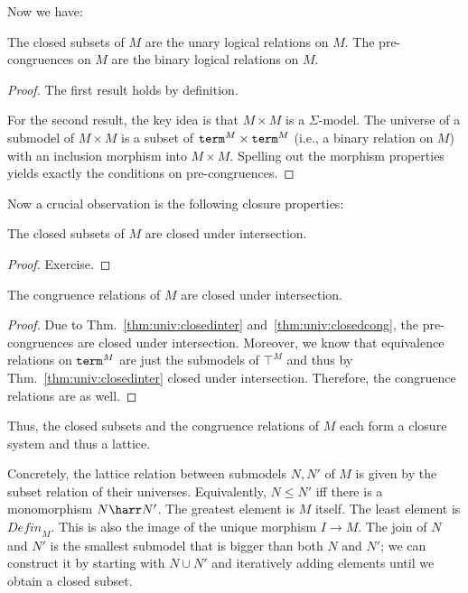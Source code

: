 Now we have:
\begin{theorem}\label{thm:univ:closedcong}
The closed subsets of $M$ are the unary logical relations on $M$.
The pre-congruences on $M$ are the binary logical relations on $M$.
\end{theorem}
\begin{proof}
The first result holds by definition.

For the second result, the key idea is that $M\times M$ is a $\Sigma$-model.
The universe of a submodel of $M\times M$ is a subset of $\mathtt{term}^M\times\mathtt{term}^M$ (i.e., a binary relation on $M$) with an inclusion morphism into $M\times M$.
Spelling out the morphism properties yields exactly the conditions on pre-congruences.
\end{proof}

Now a crucial observation is the following closure properties:

\begin{theorem}\label{thm:univ:closedinter}
The closed subsets of $M$ are closed under intersection.
\end{theorem}
\begin{proof}
Exercise.
\end{proof}

\begin{theorem}
The congruence relations of $M$ are closed under intersection.
\end{theorem}
\begin{proof}
Due to Thm.~\ref{thm:univ:closedinter} and~\ref{thm:univ:closedcong}, the pre-congruences are closed under intersection.
Moreover, we know that equivalence relations on $\mathtt{term}^M$ are just the submodels of $\top^M$ and thus by Thm.~\ref{thm:univ:closedinter} closed under intersection.
Therefore, the congruence relations are as well.
\end{proof}

Thus, the closed subsets and the congruence relations of $M$ each form a closure system and thus a lattice.

Concretely, the lattice relation between submodels $N,N'$ of $M$ is given by the subset relation of their universes.
Equivalently, $N\leq N'$ iff there is a monomorphism $N\harr N'$.
The greatest element is $M$ itself.
The least element is $\mathit{Defin}_M$. This is also the image of the unique morphism $I\to M$.
The join of $N$ and $N'$ is the smallest submodel that is bigger than both $N$ and $N'$; we can construct it by starting with $N\cup N'$ and iteratively adding elements until we obtain a closed subset.

